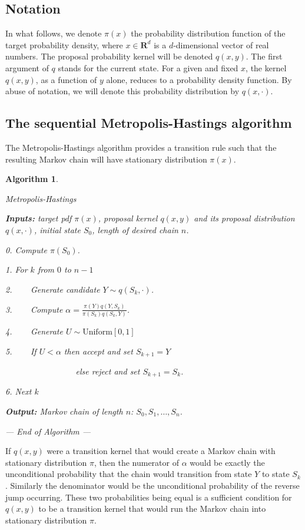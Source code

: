 \documentclass[11pt,letterpaper]{article}       %
\newtheorem{algX}{Algorithm}
\newenvironment{algorithm}       {\begin{algX}\begin{em}}%
                                 {\par\noindent --- End of Algorithm ---
                                 \end{em}\end{algX}}
\newcommand{\step}[2]            {\begin{list}{}
                                  {  \setlength{\topsep}{0cm}
                                     \setlength{\partopsep}{0cm}
                                     \setlength{\leftmargin}{0.8cm}
                                     \setlength{\labelwidth}{0.7cm}
                                     \setlength{\labelsep}{0.1cm}    }
                                  \item[#1]#2    \end{list}}
\begin{document}
\subsection{Notation} 

In what follows, we denote $\pi(x)$ the probability distribution function of
the target probability density, where $x\in\mathbf{R}^d$ is a $d$-dimensional
vector of real numbers.  The proposal probability kernel will be denoted
$q(x,y)$.  The first argument of $q$ stands for the current state.  For a given
and fixed $x$, the kernel $q(x,y)$, as a function of $y$ alone, reduces to a
probability density function. By abuse of notation, we will denote this
probability distribution by $q(x,\cdot)$.

\subsection{The sequential Metropolis-Hastings algorithm} \label{subsect-m-h-sequential}

The Metropolis-Hastings algorithm provides a transition rule such that the 
resulting Markov chain will have stationary distribution $\pi(x)$. 

\begin{algorithm}{Metropolis-Hastings}
\step{\textbf{Inputs:}} { target pdf $\pi(x)$, proposal kernel $q(x,y)$ and its
proposal distribution $q(x, \cdot)$, initial state $S_0$, length of desired
chain $n$. }
\step{0.} {Compute $\pi(S_0)$.}
\step{1.} {For $k$ from $0$ to $n-1$}
\step{2.} {~~~ Generate candidate $Y \sim q(S_k, \cdot)$.}
\step{3.} {~~~ Compute $\displaystyle \alpha=\frac{\pi(Y)q(Y,S_k)}{\pi(S_k)q(S_k,Y)}$.}
\step{4.} {~~~ Generate $U\sim \mathrm{Uniform}[0,1]$ }
\step{5.} {~~~ If $U<\alpha$ then \emph{accept} and set $S_{k+1}=Y$ }
\step{}   {~~~~~~~~~~~~~~~~ else \emph{reject} and set $S_{k+1}=S_k$. }
\step{6.} {Next $k$ }
\step{\textbf{Output:}} { Markov chain of length $n$: $S_0, S_1, \ldots, S_n$. }
\end{algorithm}

If $q(x,y)$ were a transition kernel that would create a Markov chain with 
stationary distribution $\pi$, then the numerator of $\alpha$ would be exactly the
unconditional probability that the chain would transition from state $Y$ to 
state $S_k$.  Similarly the denominator would be the unconditional probability of
the reverse jump occurring.  These two probabilities being equal is a sufficient
condition for $q(x,y)$ to be a transition kernel that would run the Markov chain
into stationary distribution $\pi$. 
\end{document}
